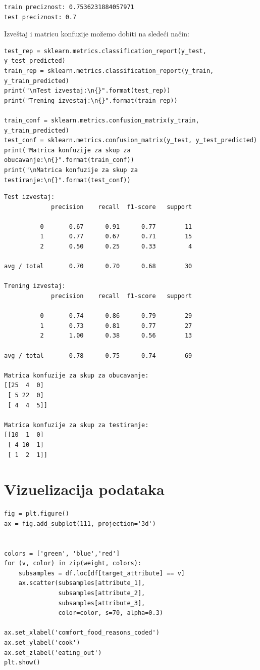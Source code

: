 \documentclass[12pt,a4paper]{article}
\begin{document}
\begin{verbatim}
train preciznost: 0.7536231884057971
test preciznost: 0.7
\end{verbatim}

Izve\v staj i matricu konfuzije mo\v zemo dobiti na slede\' ci na\v cin:

\begin{lstlisting}
test_rep = sklearn.metrics.classification_report(y_test, y_test_predicted)
train_rep = sklearn.metrics.classification_report(y_train, y_train_predicted)
print("\nTest izvestaj:\n{}".format(test_rep))
print("Trening izvestaj:\n{}".format(train_rep))

train_conf = sklearn.metrics.confusion_matrix(y_train, y_train_predicted)
test_conf = sklearn.metrics.confusion_matrix(y_test, y_test_predicted)
print("Matrica konfuzije za skup za obucavanje:\n{}".format(train_conf))
print("\nMatrica konfuzije za skup za testiranje:\n{}".format(test_conf))
\end{lstlisting}

\begin{verbatim}
Test izvestaj:
             precision    recall  f1-score   support

          0       0.67      0.91      0.77        11
          1       0.77      0.67      0.71        15
          2       0.50      0.25      0.33         4

avg / total       0.70      0.70      0.68        30

Trening izvestaj:
             precision    recall  f1-score   support

          0       0.74      0.86      0.79        29
          1       0.73      0.81      0.77        27
          2       1.00      0.38      0.56        13

avg / total       0.78      0.75      0.74        69

Matrica konfuzije za skup za obucavanje:
[[25  4  0]
 [ 5 22  0]
 [ 4  4  5]]

Matrica konfuzije za skup za testiranje:
[[10  1  0]
 [ 4 10  1]
 [ 1  2  1]]
\end{verbatim}

\section{Vizuelizacija podataka}


\begin{lstlisting}
fig = plt.figure()
ax = fig.add_subplot(111, projection='3d')


colors = ['green', 'blue','red']
for (v, color) in zip(weight, colors):
    subsamples = df.loc[df[target_attribute] == v]
    ax.scatter(subsamples[attribute_1], 
               subsamples[attribute_2], 
               subsamples[attribute_3],
               color=color, s=70, alpha=0.3)

ax.set_xlabel('comfort_food_reasons_coded')
ax.set_ylabel('cook')
ax.set_zlabel('eating_out')
plt.show()
\end{lstlisting}
\end{document}
